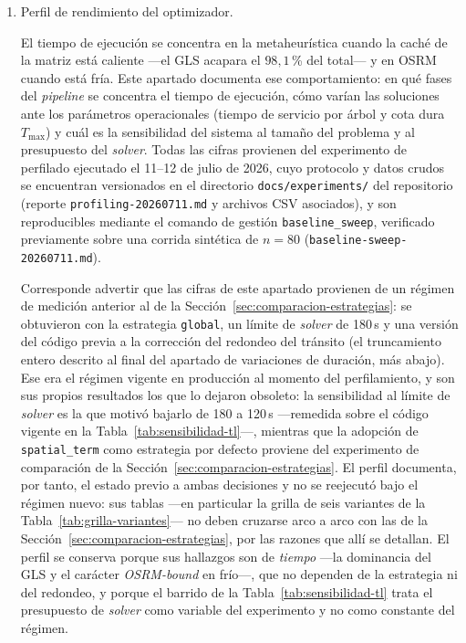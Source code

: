 \begin{enumerate}
\item Perfil de rendimiento del optimizador.
\label{anx:perfil-rendimiento}

El tiempo de ejecución se concentra en la metaheurística cuando la caché de la matriz está caliente
---el GLS acapara el $98{,}1$\,\% del total--- y en OSRM cuando está fría. Este apartado documenta
ese comportamiento: en qué fases del \textit{pipeline} se concentra el tiempo de ejecución, cómo
varían las soluciones ante los parámetros operacionales (tiempo de servicio por árbol y cota dura
$T_{\max}$) y cuál es la sensibilidad del sistema al tamaño del problema y al presupuesto del
\textit{solver}. Todas las cifras provienen del experimento de perfilado ejecutado el 11--12 de
julio de 2026, cuyo protocolo y datos crudos se encuentran versionados en el directorio
\texttt{docs/experiments/} del repositorio (reporte \texttt{profiling-20260711.md} y archivos CSV
asociados), y son reproducibles mediante el comando de gestión \texttt{baseline\_sweep}, verificado
previamente sobre una corrida sintética de $n=80$ (\texttt{baseline-sweep-20260711.md}).

Corresponde advertir que las cifras de este apartado provienen de un régimen de medición anterior al
de la Sección~\ref{sec:comparacion-estrategias}: se obtuvieron con la estrategia \texttt{global}, un
límite de \textit{solver} de 180\,s y una versión del código previa a la corrección del redondeo del
tránsito (el truncamiento entero descrito al final del apartado de variaciones de duración, más abajo). Ese
era el régimen vigente en producción al momento del perfilamiento, y son sus propios resultados los
que lo dejaron obsoleto: la sensibilidad al límite de \textit{solver} es la que motivó bajarlo de
180 a 120\,s ---remedida sobre el código vigente en la Tabla~\ref{tab:sensibilidad-tl}---, mientras
que la adopción de \texttt{spatial\_term} como estrategia por defecto proviene del experimento de
comparación de la Sección~\ref{sec:comparacion-estrategias}. El perfil documenta, por tanto, el
estado previo a ambas decisiones y no se reejecutó bajo el régimen nuevo: sus tablas ---en
particular la grilla de seis variantes de la Tabla~\ref{tab:grilla-variantes}--- no deben cruzarse
arco a arco con las de la Sección~\ref{sec:comparacion-estrategias}, por las razones que allí se
detallan. El perfil se conserva porque sus hallazgos son de \textit{tiempo} ---la dominancia del
GLS y el carácter \textit{OSRM-bound} en frío---, que no dependen de la estrategia ni del redondeo,
y porque el barrido de la Tabla~\ref{tab:sensibilidad-tl} trata el presupuesto de \textit{solver}
como variable del experimento y no como constante del régimen.


\end{enumerate}
